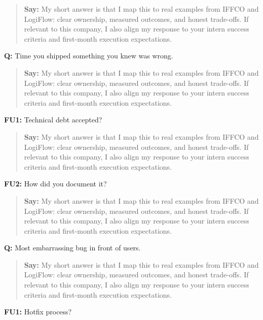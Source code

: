 \documentclass[9pt,a4paper]{article}
\begin{document}
\begin{quote}\small\textbf{Say:} My short answer is that I map this to real examples from IFFCO and LogiFlow: clear ownership, measured outcomes, and honest trade-offs. If relevant to this company, I also align my response to your intern success criteria and first-month execution expectations.\end{quote}
\vspace{2mm}
\textbf{Q:} Time you shipped something you knew was wrong.

\begin{quote}\small\textbf{Say:} My short answer is that I map this to real examples from IFFCO and LogiFlow: clear ownership, measured outcomes, and honest trade-offs. If relevant to this company, I also align my response to your intern success criteria and first-month execution expectations.\end{quote}
\vspace{2mm}
\textbf{FU1:} Technical debt accepted?

\begin{quote}\small\textbf{Say:} My short answer is that I map this to real examples from IFFCO and LogiFlow: clear ownership, measured outcomes, and honest trade-offs. If relevant to this company, I also align my response to your intern success criteria and first-month execution expectations.\end{quote}
\vspace{2mm}
\textbf{FU2:} How did you document it?

\begin{quote}\small\textbf{Say:} My short answer is that I map this to real examples from IFFCO and LogiFlow: clear ownership, measured outcomes, and honest trade-offs. If relevant to this company, I also align my response to your intern success criteria and first-month execution expectations.\end{quote}
\vspace{2mm}
\textbf{Q:} Most embarrassing bug in front of users.

\begin{quote}\small\textbf{Say:} My short answer is that I map this to real examples from IFFCO and LogiFlow: clear ownership, measured outcomes, and honest trade-offs. If relevant to this company, I also align my response to your intern success criteria and first-month execution expectations.\end{quote}
\vspace{2mm}
\textbf{FU1:} Hotfix process?
\end{document}
